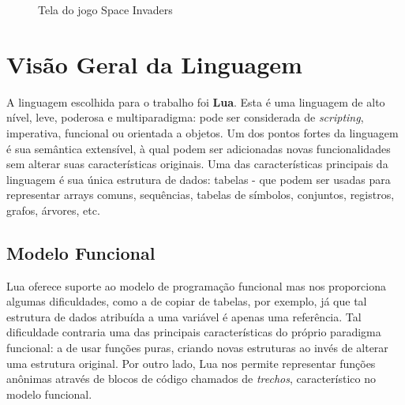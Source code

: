 \documentclass[rel_mlp]{iiufrgs}
\begin{document}
\begin{figure}[H]
     \centering
     \caption{Tela do jogo Space Invaders}
     \label{fig:figura1}
 \end{figure}


\chapter{Visão Geral da Linguagem}

A linguagem escolhida para o trabalho foi \textbf{Lua}. Esta é uma linguagem de alto nível, leve, poderosa e multiparadigma: pode ser considerada de \textit{scripting}, imperativa, funcional ou orientada a objetos. Um dos pontos fortes da linguagem é sua semântica extensível, à qual podem ser adicionadas novas funcionalidades sem alterar suas características originais. Uma das características principais da linguagem é sua única estrutura de dados: tabelas - que podem ser usadas para representar arrays comuns, sequências, tabelas de símbolos, conjuntos, registros, grafos, árvores, etc.

\section{Modelo Funcional}

Lua oferece suporte ao modelo de programação funcional mas nos proporciona algumas dificuldades, como a de copiar de tabelas, por exemplo, já que tal estrutura de dados atribuída a uma variável é apenas uma referência. Tal dificuldade contraria uma das principais características do próprio paradigma funcional: a de usar funções puras, criando novas estruturas ao invés de alterar uma estrutura original. Por outro lado, Lua nos permite representar funções anônimas através de blocos de código chamados de \textit{trechos}, característico no modelo funcional.
\end{document}
